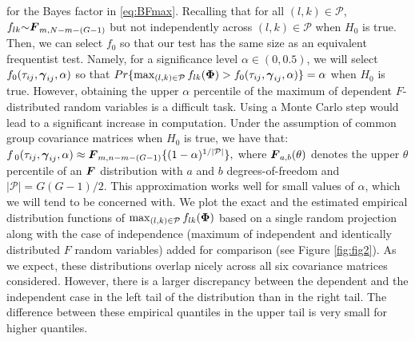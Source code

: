 \documentclass[alpha-refs]{wiley-article}
\theoremstyle{plain}%
\theoremstyle{definition}
\newcommand{\uF}       {\mbox{\boldmath$F$}}
\newcommand{\ugamma}            {\mbox{\boldmath$\gamma$}}
\newcommand{\uPhi}              {\mbox{\boldmath$\Phi$}}
\begin{document}
for the Bayes factor in \eqref{eq:BFmax}. 
Recalling that for all $(l,k) \in \mathcal{P}$, $f_{lk} {\sim} \uF_{m, N - m- (G-1)}$ but not independently across $(l, k)\in\mathcal{P}$ when $H_0$ is true. Then, we can select $f_{0}$ so that our test has the same size as an equivalent frequentist test. Namely, for a significance level $\alpha \in (0, 0.5)$, we will select $f_0(\tau_{ij},\ugamma_{ij}, \alpha)$ so that 
$Pr\{\max_{(l, k)\in\mathcal{P}}f_{lk}(\uPhi) > f_{0}(\tau_{ij},\ugamma_{ij}, \alpha)\} = \alpha$ when $H_{0}$ is true. However, obtaining the upper $\alpha$ percentile of the maximum of dependent $F$-distributed random variables is a difficult task. Using a Monte Carlo step would lead to a significant increase in computation. Under the assumption of common group covariance matrices when $H_0$ is true, we have that: 
$f_{\;0}(\tau_{ij},\ugamma_{ij}, \alpha) \approx \uF_{m, n -m -(G-1)}\{(1 - \alpha)^{1/|\mathcal{P}|}\},$ where $\uF_{a, b}(\theta)$ denotes the upper $\theta$ percentile of an $\uF$ distribution with $a$ and $b$ degrees-of-freedom and $|\mathcal{P}| = G(G-1)/2$. This approximation works well for small values of $\alpha$, which we will tend to be concerned with. We plot the exact and the estimated empirical distribution functions of $\max_{(l, k)\in\mathcal{P}}f_{lk}(\uPhi)$ based on a single random projection along with the case of independence (maximum of independent and identically distributed $F$ random variables) added for comparison (see Figure \ref{fig:fig2}). As we expect, these distributions overlap nicely across all six covariance matrices considered. However, there is a larger discrepancy between the dependent and the independent case in the left tail of the distribution than in the right tail. The difference between these empirical quantiles in the upper tail is very small for higher quantiles.
\end{document}
